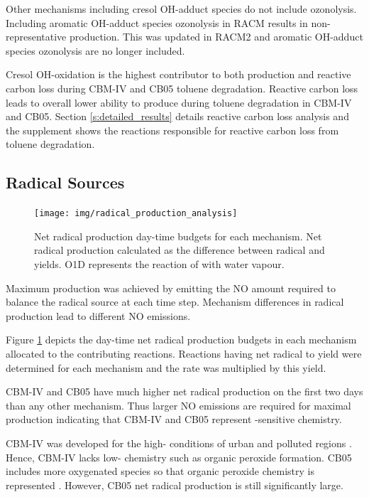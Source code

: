 Other mechanisms including cresol OH-adduct species do not include ozonolysis.
Including aromatic OH-adduct species ozonolysis in RACM results in non-representative  production. 
This was updated in RACM2 and aromatic OH-adduct species ozonolysis are no longer included.

Cresol OH-oxidation is the highest contributor to both  production and reactive carbon loss during CBM-IV and CB05 toluene degradation.
Reactive carbon loss leads to overall lower ability to produce  during toluene degradation in CBM-IV and CB05.
Section \ref{s:detailed_results} details reactive carbon loss analysis and the supplement shows the reactions responsible for reactive carbon loss from toluene degradation.

\subsection{Radical Sources} \label{ss:radicals}

\begin{figure}
    \centering
    \texttt{[image: img/radical\_production\_analysis]}
    \vspace{0mm}
    \caption{Net radical production day-time budgets for each mechanism. Net radical production calculated as the difference between radical and  yields. O1D represents the reaction of  with water vapour.}
    \vspace{-4mm}
    \label{f:radical_production} 
\end{figure} 

Maximum  production was achieved by emitting the NO amount required to balance the radical source at each time step. 
Mechanism differences in radical production lead to different NO emissions.

Figure \ref{f:radical_production} depicts the day-time net radical production budgets in each mechanism allocated to the contributing reactions.
Reactions having net radical to  yield were determined for each mechanism and the rate was multiplied by this yield.

CBM-IV and CB05 have much higher net radical production on the first two days than any other mechanism.
Thus larger NO emissions are required for maximal  production indicating that CBM-IV and CB05 represent -sensitive chemistry.

CBM-IV was developed for the high- conditions of urban and polluted regions \citep{Gery:1989}.
Hence, CBM-IV lacks low- chemistry such as organic peroxide formation.
CB05 includes more oxygenated species so that organic peroxide chemistry is represented \citep{Yarwood:2005}.
However, CB05 net radical production is still significantly large.

